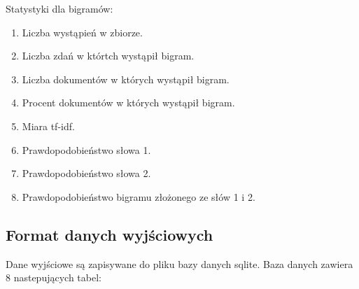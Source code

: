 \documentclass[11pt]{article}
\begin{document}
Statystyki dla bigramów:
\begin{enumerate}
 \item Liczba wystąpień w zbiorze.
 \item Liczba zdań w którtch wystąpił bigram.
 \item Liczba dokumentów w których wystąpił bigram.
 \item Procent dokumentów w których wystąpił bigram.
 \item Miara tf-idf.
 \item Prawdopodobieństwo słowa 1.
 \item Prawdopodobieństwo słowa 2.
 \item Prawdopodobieństwo bigramu złożonego ze słów 1 i 2.
\end{enumerate}

\subsection{Format danych wyjściowych}
Dane wyjściowe są zapisywane do pliku bazy danych sqlite.
Baza danych zawiera 8 nastepujących tabel:
\end{document}
